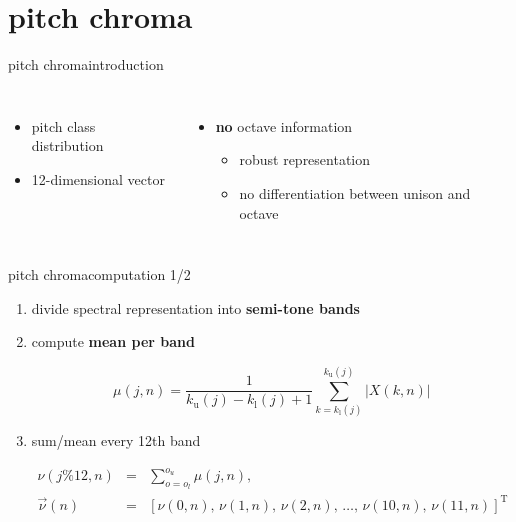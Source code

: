     \section[pitch chroma]{pitch chroma}
        \begin{frame}{pitch chroma}{introduction}
            \begin{columns}
                \begin{itemize}
                    \item	pitch class distribution 
                    \item	12-dimensional vector
                \end{itemize}
                \begin{itemize}
                    \item	\textbf{no} octave information
                        \begin{itemize}
                            \item	robust representation
                            \item	no differentiation between unison and octave
                        \end{itemize}
                \end{itemize}
                
            \end{columns}
        \end{frame}
        \begin{frame}{pitch chroma}{computation 1/2}
            \begin{enumerate}
                \item	divide spectral representation into \textbf{semi-tone bands}
                \item<2->	compute \textbf{mean per band}
                    \begin{footnotesize}
                        \begin{equation*}
                            \mu(j,n)		= \frac{1}{k_{\mathrm{u}}(j)-k_{\mathrm{l}}(j)+1}\sum\limits_{k=k_{\mathrm{l}}(j)}^{k_{\mathrm{u}}(j)}{|X(k,n)|}
                        \end{equation*}
                    \end{footnotesize}
                \item<3->	sum/mean every 12th band
                    \begin{footnotesize}
                        \begin{eqnarray*}
                            \nu(j\% 12 ,n)		&=& \sum\limits_{o=o_l}^{o_u}{\mu(j,n)}\label{eq:pc}, \\
                            \vec{\nu}(n) 	&=& \left[\nu(0,n),\, \nu(1,n),\, \nu(2,n),\, \ldots,\, \nu(10,n),\, \nu(11,n)\right]^\mathrm{T} \nonumber
                        \end{eqnarray*}
                    \end{footnotesize}
            \end{enumerate}
        \end{frame}

